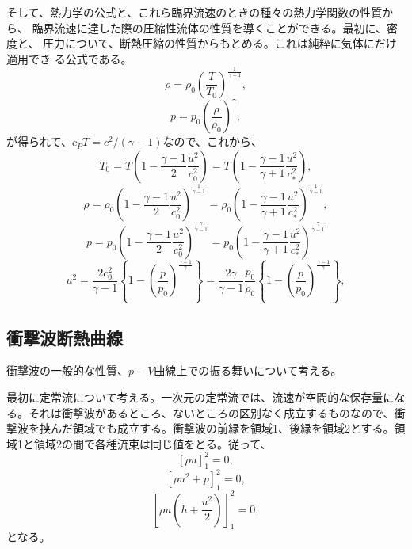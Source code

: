 そして、熱力学の公式と、これら臨界流速のときの種々の熱力学関数の性質から、
臨界流速に達した際の圧縮性流体の性質を導くことができる。最初に、密度と、
圧力について、断熱圧縮の性質からもとめる。これは純粋に気体にだけ適用でき
る公式である。
\begin{equation}
 \rho = \rho_0
  \left(\frac{T}{T_0}\right)^{\frac{1}{\gamma - 1}},
\end{equation}
\begin{equation}
 p = p_0 \left(\frac{\rho}{\rho_0}\right)^{\gamma},
\end{equation}
が得られて、$c_PT=c^2/(\gamma - 1)$なので、これから、
\begin{equation}
 T_0 = T\left(1-\frac{\gamma - 1}{2}\frac{u^2}{c_0^2}\right)
  = T\left(1-\frac{\gamma - 1}{\gamma + 1}\frac{u^2}{c_*^2}\right),
\end{equation}
\begin{equation}
 \rho = 
  \rho_0 \left(
   1 - \frac{\gamma - 1}{2}\frac{u^2}{c_0^2}
  \right)^{\frac{1}{\gamma - 1}}
  = \rho_0 \left(
   1 - \frac{\gamma - 1}{\gamma + 1}\frac{u^2}{c_*^2}
	   \right)^{\frac{1}{\gamma - 1}},
\end{equation}
\begin{equation}
 p = p_0\left(
   1 - \frac{\gamma - 1}{2}\frac{u^2}{c_0^2}
\right)^{\frac{\gamma}{\gamma - 1}}
 = p_0\left(
   1 - \frac{\gamma - 1}{\gamma + 1}\frac{u^2}{c_*^2}
\right)^{\frac{\gamma}{\gamma - 1}}
\end{equation}
\begin{equation}
 u^2 = \frac{2c_0^2}{\gamma - 1}
  \left\{1-\left(\frac{p}{p_0}\right)^{\frac{\gamma - 1}{\gamma}}\right\}
  = \frac{2\gamma}{\gamma - 1}\frac{p_0}{\rho_0}
  \left\{1-\left(\frac{p}{p_0}\right)^{\frac{\gamma - 1}{\gamma}}\right\},
\end{equation}

\subsection{衝撃波断熱曲線}
衝撃波の一般的な性質、$p-V$曲線上での振る舞いについて考える。

最初に定常流について考える。一次元の定常流では、流速が空間的な保存量にな
る。それは衝撃波があるところ、ないところの区別なく成立するものなので、衝
撃波を挟んだ領域でも成立する。衝撃波の前縁を領域1、後縁を領域2とする。領
域1と領域2の間で各種流束は同じ値をとる。従って、
\begin{equation}
 \left[\rho u\right]^2_1 = 0, 
\end{equation}
\begin{equation}
 \left[\rho u^2 + p\right]^2_1 = 0,
\end{equation}
\begin{equation}
 \left[\rho u \left(h + \frac{u^2}{2}\right)\right]^2_1 = 0,
\end{equation}
となる。

